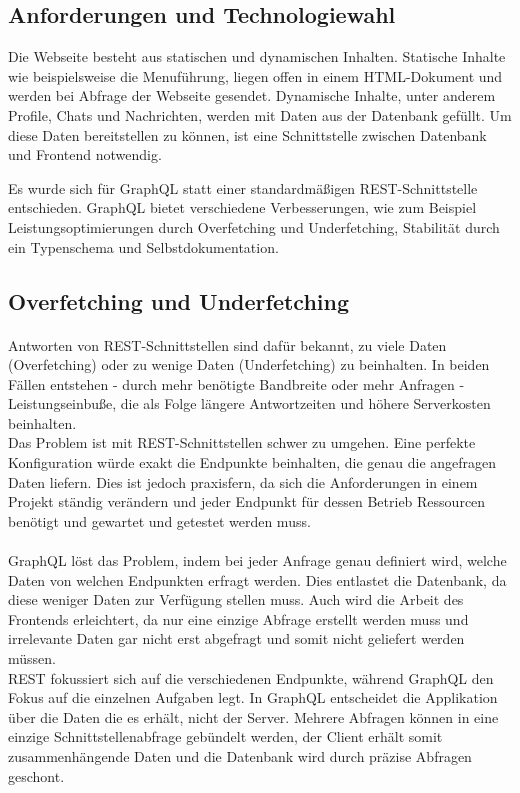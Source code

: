 \subsection{Anforderungen und Technologiewahl}
Die Webseite besteht aus statischen und dynamischen Inhalten.
Statische Inhalte wie beispielsweise die Menuführung, liegen offen in einem HTML-Dokument und werden bei Abfrage der Webseite gesendet. 
Dynamische Inhalte, unter anderem Profile, Chats und Nachrichten, werden mit Daten aus der Datenbank gefüllt.
Um diese Daten bereitstellen zu können, ist eine Schnittstelle zwischen Datenbank und Frontend notwendig. 

Es wurde sich für GraphQL statt einer standardmäßigen REST-Schnittstelle entschieden.
GraphQL bietet verschiedene Verbesserungen, wie zum Beispiel Leistungsoptimierungen durch Overfetching und Underfetching, Stabilität durch ein Typenschema und Selbstdokumentation.

\subsection{Overfetching und Underfetching}
\paragraph{}
Antworten von REST-Schnittstellen sind dafür bekannt, zu viele Daten (Overfetching) oder zu wenige Daten (Underfetching) zu beinhalten.
In beiden Fällen entstehen - durch mehr benötigte Bandbreite oder mehr Anfragen - Leistungseinbuße, die als Folge längere Antwortzeiten und höhere Serverkosten beinhalten. \\  %
Das Problem ist mit REST-Schnittstellen schwer zu umgehen.
Eine perfekte Konfiguration würde exakt die Endpunkte beinhalten, die genau die angefragen Daten liefern.
Dies ist jedoch praxisfern, da sich die Anforderungen in einem Projekt ständig verändern und jeder Endpunkt für dessen Betrieb Ressourcen benötigt und gewartet und getestet werden muss.

\paragraph{}
GraphQL löst das Problem, indem bei jeder Anfrage genau definiert wird, welche Daten von welchen Endpunkten erfragt werden.
Dies entlastet die Datenbank, da diese weniger Daten zur Verfügung stellen muss.
Auch wird die Arbeit des Frontends erleichtert, da nur eine einzige Abfrage erstellt werden muss und irrelevante Daten gar nicht erst abgefragt und somit nicht geliefert werden müssen.\\
REST fokussiert sich auf die verschiedenen Endpunkte, während GraphQL den Fokus auf die einzelnen Aufgaben legt.
In GraphQL entscheidet die Applikation über die Daten die es erhält, nicht der Server.
Mehrere Abfragen können in eine einzige Schnittstellenabfrage gebündelt werden, der Client erhält somit zusammenhängende Daten und die Datenbank wird durch präzise Abfragen geschont.

